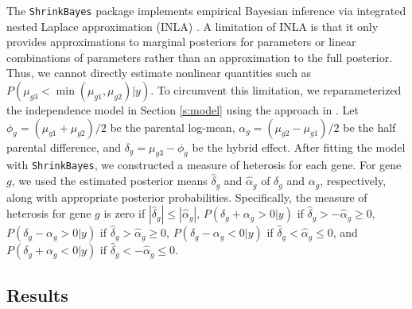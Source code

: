 \documentclass[useAMS,usenatbib,referee]{biom}
\begin{document}
The {\tt ShrinkBayes} package implements empirical Bayesian inference via integrated nested Laplace approximation (INLA) \citep{rue2009approximate,van2014shrinkbayes}. A limitation of INLA is that it only provides approximations to marginal posteriors for parameters or linear combinations of parameters rather than an approximation to the full posterior. Thus, we cannot directly estimate nonlinear quantities such as $P(\mu_{g3} < \min(\mu_{g1},\mu_{g2})|y)$. To circumvent this limitation, we reparameterized the independence model in Section \ref{s:model} using the approach in \cite{ji2014estimation}. 
Let $\phi_g = (\mu_{g1}+\mu_{g2})/2$ be the parental log-mean, $\alpha_g = (\mu_{g2}-\mu_{g1})/2$ be the half parental difference, and $\delta_g = \mu_{g3} - \phi_g$ be the hybrid effect. After fitting the model with {\tt ShrinkBayes}, we constructed a measure of heterosis for each gene. For gene $g$, we used the estimated posterior means $\hat{\delta}_g$ and $\hat{\alpha}_g$ of $\delta_g$ and $\alpha_g$, respectively, along with appropriate posterior probabilities. Specifically, the measure of heterosis for gene $g$ is zero if $|\hat{\delta}_g| \le |\hat{\alpha}_g|$, $P(\delta_g + \alpha_g > 0 |y)$ if $\hat{\delta}_g > -\hat{\alpha}_g \ge 0$, $P(\delta_g - \alpha_g > 0 |y)$ if $\hat{\delta}_g > \hat{\alpha}_g \ge 0$, $P(\delta_g - \alpha_g < 0 |y)$ if $\hat{\delta}_g < \hat{\alpha}_g \le 0$, and $P(\delta_g + \alpha_g < 0 |y)$ if $\hat{\delta}_g < -\hat{\alpha}_g \le 0$.  

\subsection{Results}
\end{document}

